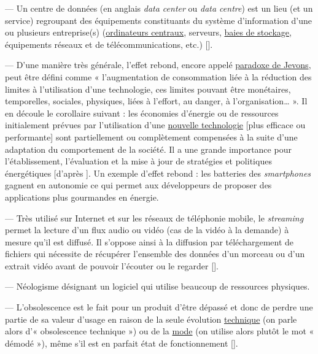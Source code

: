 
\begin{jazzitemize}
\item {} --- Un centre de données (en anglais \textit{data center} ou \textit{data centre}) est un lieu (et un service) regroupant des équipements constituants du système d’information d'une ou plusieurs entreprise(s) (\href{https://fr.wikipedia.org/wiki/Ordinateur_central}{ordinateurs centraux}, serveurs, \href{https://fr.wikipedia.org/wiki/Baie_de_stockage}{baies de stockage}, équipements réseaux et de télécommunications, etc.) [\href{https://fr.wikipedia.org/wiki/Centre_de_donn\%C3\%A9es}{\faWikipediaW}].
\item {} --- D’une manière très générale, l’effet rebond, encore appelé \href{https://fr.wikipedia.org/wiki/Paradoxe_de_Jevons}{paradoxe de Jevons}, peut être défini comme « l’augmentation de consommation liée à la réduction des limites à l’utilisation d’une technologie, ces limites pouvant être monétaires, temporelles, sociales, physiques, liées à l’effort, au danger, à l’organisation… ». Il en découle le corollaire suivant : les économies d’énergie ou de ressources initialement prévues par l’utilisation d’une \href{https://fr.wikipedia.org/wiki/Nouvelles_technologies}{nouvelle technologie} [plus efficace ou performante] sont partiellement ou complètement compensées à la suite d'une adaptation du comportement de la société. Il a une grande importance pour l'établissement, l'évaluation et la mise à jour de stratégies et politiques énergétiques [d'après \href{https://fr.wikipedia.org/wiki/Effet_rebond_(\%C3\%A9conomie)}{\faWikipediaW}]. Un exemple d'effet rebond : les batteries des \textit{smartphones} gagnent en autonomie ce qui permet aux développeurs de proposer des applications plus gourmandes en énergie.
\item {} --- Très utilisé sur Internet et sur les réseaux de téléphonie mobile, le \textit{streaming} permet la lecture d'un flux audio ou vidéo (cas de la vidéo à la demande) à mesure qu'il est diffusé. Il s'oppose ainsi à la diffusion par téléchargement de fichiers qui nécessite de récupérer l'ensemble des données d'un morceau ou d'un extrait vidéo avant de pouvoir l'écouter ou le regarder [\href{https://fr.wikipedia.org/wiki/Streaming}{\faWikipediaW}].
\item {} --- Néologisme désignant un logiciel qui utilise beaucoup de ressources physiques.
\item {} --- L'obsolescence est le fait pour un produit d'être dépassé et donc de perdre une partie de sa valeur d'usage en raison de la seule évolution \href{https://fr.wikipedia.org/wiki/Technique}{technique} (on parle alors d'« obsolescence technique ») ou de la \href{https://fr.wikipedia.org/wiki/Tendance_(mode)}{mode} (on utilise alors plutôt le mot « démodé »), même s'il est en parfait état de fonctionnement [\href{https://fr.wikipedia.org/wiki/Obsolescence}{\faWikipediaW}].
\end{jazzitemize}

